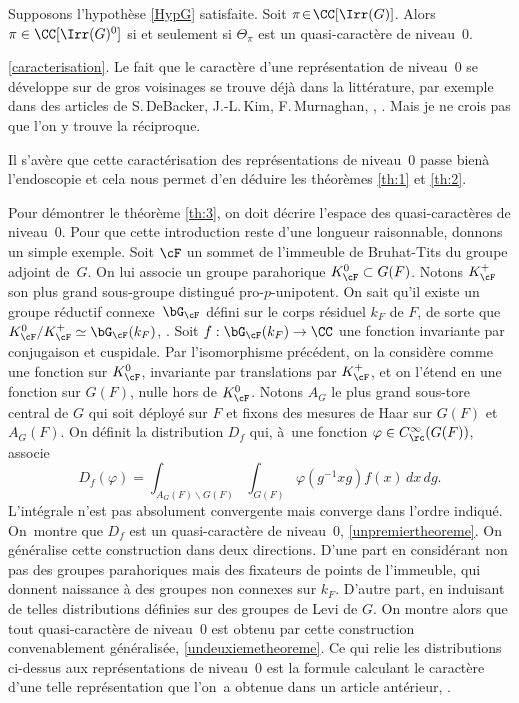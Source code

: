 \begin{thm}\label{th:3}
Supposons l'hypothèse \ref{HypG} satisfaite. Soit \hbox{$\pi\!\in\!\CC[\Irr(G)]$}. Alors $\pi\in \CC[\Irr(G)^0]$ si et seulement si $\Theta_{\pi}$ est un quasi-caractère de niveau~$0$.
\end{thm}

\Cf \ref{caracterisation}. Le fait que le caractère d'une représentation de niveau~$0$ se développe sur de gros voisinages se trouve déjà dans la littérature, par exemple dans des articles de S.\,DeBacker, J.-L.\,Kim, F.\,Murnaghan, \cf \cite[Th.\,3.5.2]{D}, \cite[Th.\,5.3.1]{KM}. Mais je ne crois pas que l'on y trouve la réciproque.

Il s'avère que cette caractérisation des représentations de niveau~$0$ \og passe bien\fg à l'endoscopie et cela nous permet d'en déduire les théorèmes \ref{th:1} et \ref{th:2}.

Pour démontrer le théorème \ref{th:3}, on doit décrire l'espace des quasi-caractères de niveau~$0$. Pour que cette introduction reste d'une longueur raisonnable, donnons un simple exemple. Soit $\cF$ un sommet de l'immeuble de Bruhat-Tits du groupe adjoint de~$G$. On lui associe un groupe parahorique $K_{\cF}^0\subset G(F)$. Notons $K_{\cF}^+$ son plus grand sous-groupe distingué pro-$p$-unipotent. On sait qu'il existe un groupe réductif connexe~$\bG_{\cF}$ défini sur le corps résiduel $k_{F}$ de $F$, de sorte que $K_{\cF}^0/K_{\cF}^+\simeq \bG_{\cF}(k_{F})$, \cf \cite[\S3.4]{T}. Soit $f:\bG_{\cF}(k_{F})\to \CC$ une fonction invariante par conjugaison et cuspidale. Par l'isomorphisme précédent, on la considère comme une fonction sur $K_{\cF}^0$, invariante par translations par $K_{\cF}^+$, et on l'étend en une fonction sur $G(F)$, nulle hors de $K_{\cF}^0$. Notons $A_{G}$ le plus grand sous-tore central de $G$ qui soit déployé sur $F$ et fixons des mesures de Haar sur $G(F)$ et $A_{G}(F)$. On définit la distribution $D_{f}$ qui, à~une fonction $\varphi\in C_{\rc}^{\infty}(G(F))$, associe\vspace*{-3pt}
\[
D_{f}(\varphi)=\int_{A_{G}(F)\backslash G(F)}\int_{G(F)}\varphi(g^{-1}xg)f(x)\,dx\,dg.
\]
L'intégrale n'est pas absolument convergente mais converge dans l'ordre indiqué. On~montre que $D_{f}$ est un quasi-caractère de niveau~$0$, \cf \ref{unpremiertheoreme}. On généralise cette construction dans deux directions. D'une part en considérant non pas des groupes parahoriques mais des fixateurs de points de l'immeuble, qui donnent naissance à des groupes non connexes sur $k_{F}$. D'autre part, en induisant de telles distributions définies sur des groupes de Levi de $G$. On montre alors que tout quasi-caractère de niveau~$0$ est obtenu par cette construction convenablement généralisée, \cf \ref{undeuxiemetheoreme}. Ce qui relie les distributions ci-dessus aux représentations de niveau~$0$ est la formule calculant le carac\-tère d'une telle représentation que l'on~a obtenue dans un article antérieur, \cf \cite{W2}.

